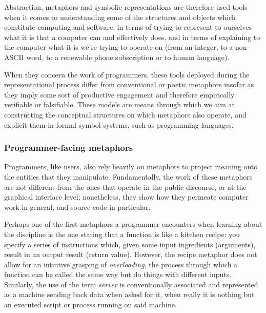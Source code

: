 Abstraction, metaphors and symbolic representations are therefore used tools when it comes to understanding some of the structures and objects which constitute computing and software, in terms of trying to represent to ourselves what it is that a computer can and effectively does, and in terms of explaining to the computer what it is we're trying to operate on (from an integer, to a non-ASCII word, to a renewable phone subscription or to human language). 

When they concern the work of programmers, these tools deployed during the representational process differ from conventional or poetic metaphors insofar as they imply some sort of productive engagement and therefore empirically verifiable or falsifiable. These models are means through which we aim at constructing the conceptual structures on which metaphors also operate, and explicit them in formal symbol systems, such as programming languages.

\subsubsection{Programmer-facing metaphors}
\label{subsubsec:metaphors-programmers}

Programmers, like users, also rely heavily on metaphors to project meaning onto the entities that they manipulate. Fundamentally, the work of these metaphors are not different from the ones that operate in the public discourse, or at the graphical interface level; nonetheless, they show how they permeate computer work in general, and source code in particular.

Perhaps one of the first metaphors a programmer encounters when learning about the discipline is the one stating that a function is like a kitchen recipe: you specify a series of instructions which, given some input ingredients (arguments), result in an output result (return value). However, the recipe metaphor does not allow for an intuitive grasping of \emph{overloading}, the process through which a function can be called the same way but do things with different inputs. Similarly, the use of the term \emph{server} is conventionally associated and represented as a machine sending back data when asked for it, when really it is nothing but an executed script or process running on said machine.

